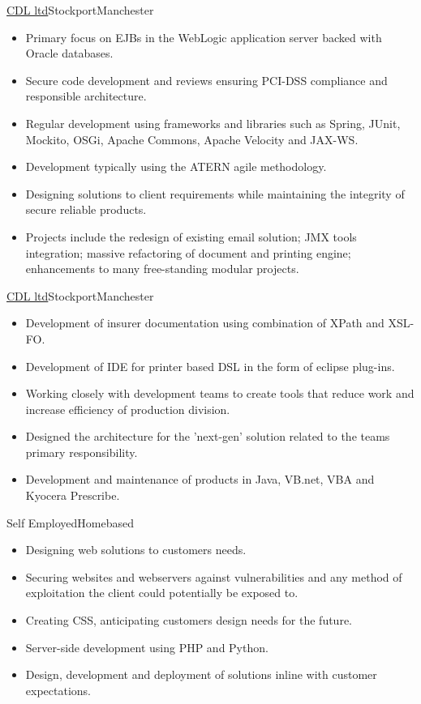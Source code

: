 \documentclass[a4paper,10pt]{moderncv}
\newcommand\weblink[2] {{\color{href} \href{#1}{#2}}}
\begin{document}
{\weblink{http://www.cdl.co.uk}{CDL ltd}}{Stockport}{Manchester}{
\begin{itemize}
  \item Primary focus on EJBs in the WebLogic application server backed with Oracle databases.
  \item Secure code development and reviews ensuring PCI-DSS compliance and responsible architecture.
  \item Regular development using frameworks and libraries such as Spring, JUnit, Mockito, OSGi, Apache Commons, Apache Velocity and JAX-WS.
  \item Development typically using the ATERN agile methodology.
  \item Designing solutions to client requirements while maintaining the integrity of secure reliable products.
  \item Projects include the redesign of existing email solution; JMX tools integration; massive refactoring of document and printing engine; enhancements to many free-standing modular projects.
\end{itemize}
}

{\weblink{http://www.cdl.co.uk}{CDL ltd}}{Stockport}{Manchester}{
\begin{itemize}
  \item Development of insurer documentation using combination of XPath and XSL-FO.
  \item Development of IDE for printer based DSL in the form of eclipse plug-ins.
  \item Working closely with development teams to create tools that reduce work and increase efficiency of production division.
  \item Designed the architecture for the 'next-gen' solution related to the teams primary responsibility.
  \item Development and maintenance of products in Java, VB.net, VBA and Kyocera Prescribe.
\end{itemize}
}

{Self Employed}{Homebased}{}{
\begin{itemize}
  \item Designing web solutions to customers needs.
  \item Securing websites and webservers against vulnerabilities and any method of exploitation the client could potentially be exposed to.
  \item Creating CSS, anticipating customers design needs for the future.
  \item Server-side development using PHP and Python.
  \item Design, development and deployment of solutions inline with customer expectations.
\end{itemize}
}
\end{document}
